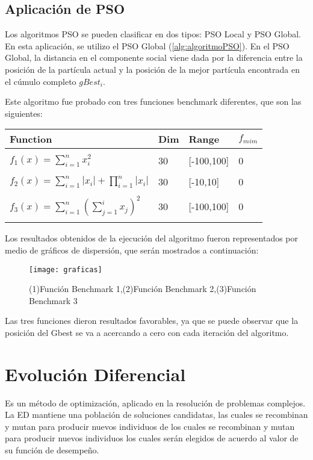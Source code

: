 \documentclass[
]{article}
\begin{document}
\subsection{Aplicación de PSO}
Los algoritmos PSO se pueden clasificar en dos tipos: PSO Local y PSO Global. En esta aplicación, se utilizo el PSO Global (\ref{alg:algoritmoPSO}).
En el PSO Global, la distancia en el componente social viene dada por la diferencia entre la posición de la partícula actual y la posición de la mejor partícula encontrada en el cúmulo completo $gBest_i$.

Este algoritmo fue probado con tres funciones benchmark diferentes, que son las siguientes:

\begin{center}
	\begin{tabular}{|l|l|l|l|}
		\hline
		Function & Dim & Range & $f_{mim}$ \\
		\hline
		 & & & \\
		$f_1(x) = \sum_{i=1}^n x^2_i$ & 30 & [-100,100] & 0 \\
		& & & \\
		$f_2(x) = \sum_{i=1}^n |x_i| + \prod_{i=1}^n|x_i|$ & 30 & [-10,10] & 0 \\
		& & & \\
		$f_3(x) = \sum_{i=1}^n(\sum_{j=1}^ix_j)^2$ & 30 & [-100,100] & 0 \\
		& & & \\
		\hline
	\end{tabular}
\end{center}

Los resultados obtenidos de la ejecución del algoritmo fueron representados por medio de gráficos de dispersión, que serán mostrados a continuación:

\begin{figure}[h]
  \centering
    \texttt{[image: graficas]}
  \caption{(1)Función Benchmark 1,(2)Función Benchmark 2,(3)Función Benchmark 3}
  \label{fig:function1PSO}
\end{figure}

Las tres funciones dieron resultados favorables, ya que se puede observar que la posición del Gbest se va a acercando a cero con cada iteración del algoritmo. 


\newpage
\section{Evolución Diferencial}
Es un método de optimización, aplicado en la resolución de problemas complejos. La ED mantiene una población de soluciones candidatas, las cuales se recombinan y mutan para producir nuevos individuos de los cuales se recombinan y mutan para producir nuevos individuos los cuales serán elegidos de acuerdo al valor de su función de desempeño.
\end{document}
